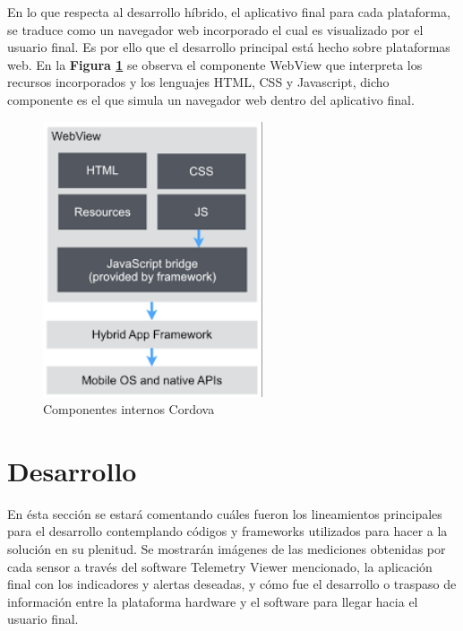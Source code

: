 \documentclass{IEEEtran}
\begin{document}
			En lo que respecta al desarrollo híbrido, el aplicativo final para cada plataforma, se traduce como un navegador web incorporado el cual es visualizado por el usuario final. Es por ello que el desarrollo principal está hecho sobre plataformas web. En la \textbf{Figura \ref{ionic-angular-cordova-webview}} se observa el componente WebView que interpreta los recursos incorporados y los lenguajes HTML, CSS y Javascript, dicho componente es el que simula un navegador web dentro del aplicativo final.

			\begin{figure}
				\centering
				\includegraphics[width=0.6\linewidth]{ionic-angular-cordova-webview}
				\caption{Componentes internos Cordova}
				\label{ionic-angular-cordova-webview}
			\end{figure}
			
	\section{Desarrollo}

		En ésta sección se estará comentando cuáles fueron los lineamientos principales para el desarrollo contemplando códigos y frameworks utilizados para hacer a la solución en su plenitud. Se mostrarán imágenes de las mediciones obtenidas por cada sensor a través del software Telemetry Viewer mencionado, la aplicación final con los indicadores y alertas deseadas, y cómo fue el desarrollo o traspaso de información entre la plataforma hardware y el software para llegar hacia el usuario final.
\end{document}
